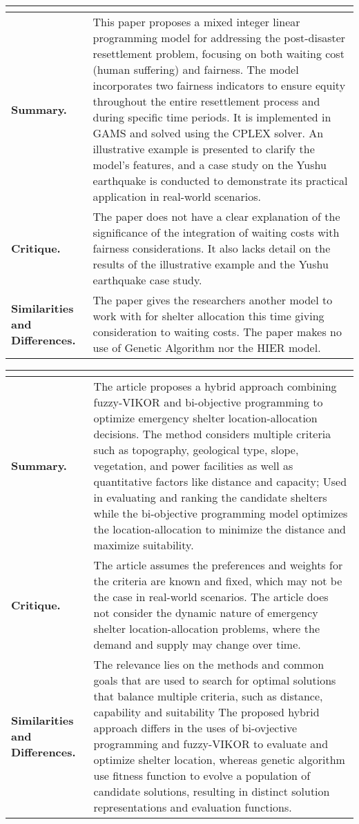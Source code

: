 \begin{longtable}{|L{.2\linewidth}|L{.74\linewidth}|}
	\hline
	\\ \hline
	\textbf{Summary.} & This paper proposes a mixed integer linear programming model for addressing the post-disaster resettlement problem, focusing on both waiting cost (human suffering) and fairness. The model incorporates two fairness indicators to ensure equity throughout the entire resettlement process and during specific time periods. It is implemented in GAMS and solved using the CPLEX solver. An illustrative example is presented to clarify the model's features, and a case study on the Yushu earthquake is conducted to demonstrate its practical application in real-world scenarios.\\ \hline
	\textbf{Critique.} & The paper does not have a clear explanation of the significance of the integration of waiting costs with fairness considerations. It also lacks detail on the results of the illustrative example and the Yushu earthquake case study.\\ \hline
	\textbf{Similarities and Differences.} & The paper gives the researchers another model to work with for shelter allocation this time giving consideration to waiting costs.	The paper makes no use of Genetic Algorithm nor the HIER model.\\ \hline
\end{longtable}

\begin{longtable}{|L{.2\linewidth}|L{.74\linewidth}|}
	\hline
	\\ \hline
	\textbf{Summary.} & The article proposes a hybrid approach combining fuzzy-VIKOR and bi-objective programming to optimize emergency shelter location-allocation decisions. The method considers multiple criteria such as topography, geological type, slope, vegetation, and power facilities as well as quantitative factors like distance and capacity; Used in evaluating and ranking the candidate shelters while the bi-objective programming model optimizes the location-allocation to minimize the distance and maximize suitability.\\ \hline
	\textbf{Critique.} & The article assumes the preferences and weights for the criteria are known and fixed, which may not be the case in real-world scenarios. The article does not consider the dynamic nature of emergency shelter location-allocation problems, where the demand and supply may change over time.\\ \hline
	\textbf{Similarities and Differences.} & The relevance lies on the methods and common goals that are used to search for optimal solutions that balance multiple criteria, such as distance, capability and suitability	The proposed hybrid approach differs in the uses of bi-ovjective programming and fuzzy-VIKOR to evaluate and optimize shelter location, whereas genetic algorithm use fitness function to evolve a population of candidate solutions, resulting in distinct solution representations and evaluation functions.\\ \hline
\end{longtable}

